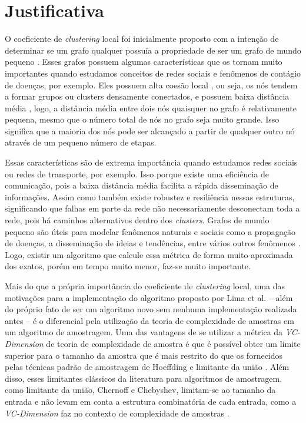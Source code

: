 \section{Justificativa}\label{sec:justificativa}

O coeficiente de \textit{clustering} local foi inicialmente proposto com a intenção de determinar se um grafo qualquer possuía a propriedade de ser um grafo de mundo pequeno \cite[440--442]{WattsSmallWorl440-442}. Esses grafos possuem algumas características que os tornam muito importantes quando estudamos conceitos de redes sociais e fenômenos de contágio de doenças, por exemplo. Eles possuem alta coesão local \cite[440--441]{WattsSmallWorl440-442}, ou seja, os nós tendem a formar grupos ou clusters densamente conectados, e possuem baixa distância média \cite{Barabasi69-70}, logo, a distância média entre dois nós quaisquer no grafo é relativamente pequena, mesmo que o número total de nós no grafo seja muito grande. Isso significa que a maioria dos nós pode ser alcançado a partir de qualquer outro nó através de um pequeno número de etapas.

Essas características são de extrema importância quando estudamos redes sociais ou redes de transporte, por exemplo. Isso porque existe uma eficiência de comunicação, pois a baixa distância média facilita a rápida disseminação de informações. Assim como também existe robustez e resiliência nessas estruturas, significando que falhas em parte da rede não necessariamente desconectam toda a rede, pois há caminhos alternativos dentro dos \textit{clusters}.
Grafos de mundo pequeno são úteis para modelar fenômenos naturais e sociais como a propagação de doenças, a disseminação de ideias e tendências, entre vários outros fenômenos \cite[441--442]{WattsSmallWorl440-442}. Logo, existir um algoritmo que calcule essa métrica de forma muito aproximada dos exatos, porém em tempo muito menor, faz-se muito importante.

Mais do que a própria importância do coeficiente de \textit{clustering} local, uma das motivações para a implementação do algoritmo proposto por Lima et al. \cite{Lima2022} – além do próprio fato de ser um algoritmo novo sem nenhuma implementação realizada antes – é o diferencial pela utilização da teoria de complexidade de amostras em um algoritmo de amostragem. Uma das vantagens de se utilizar a métrica da \textit{VC-Dimension} de teoria de complexidade de amostra é que é possível obter um limite superior para o tamanho da amostra que é mais restrito do que os fornecidos pelas técnicas padrão de amostragem de Hoeffding e limitante da união \cite[63--72]{Lima2022}. Além disso, esses limitantes clássicos da literatura para algoritmos de amostragem, como limitante da união, Chernoff e Chebyshev, limitam-se ao tamanho da entrada e não levam em conta a estrutura combinatória de cada entrada, como a \textit{VC-Dimension} faz no contexto de complexidade de amostras  \cite[14--26]{Lima2022}.

